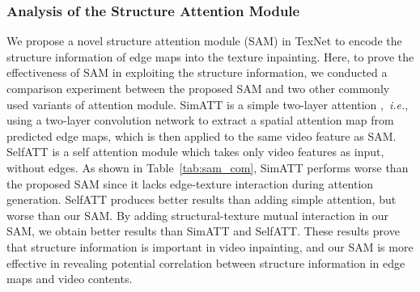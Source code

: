 \subsubsection{Analysis of the Structure Attention Module}
We propose a novel structure attention module (SAM) in TexNet to encode the structure information of edge maps into the texture inpainting. 
{\color{blue}
Here, to prove the effectiveness of SAM in exploiting the structure information, we conducted a comparison experiment between the proposed SAM and two other commonly used variants of attention module. SimATT is a simple two-layer attention \cite{min2019two},~\emph{i.e.}, using a two-layer convolution network to extract a spatial attention map from predicted edge maps, which is then applied to the same video feature as SAM. SelfATT is a self attention module \cite{vaswani2017attention} which takes only video features as input, without edges. 
As shown in Table~\ref{tab:sam_com}, SimATT performs worse than the proposed SAM since it lacks edge-texture interaction during attention generation. SelfATT produces better results than adding simple attention, but worse than our SAM. By adding structural-texture mutual interaction in our SAM, we obtain better results than SimATT and SelfATT. These results prove that structure information is important in video inpainting, and our SAM is more effective in revealing potential correlation between structure information in edge maps and video contents.	
}



